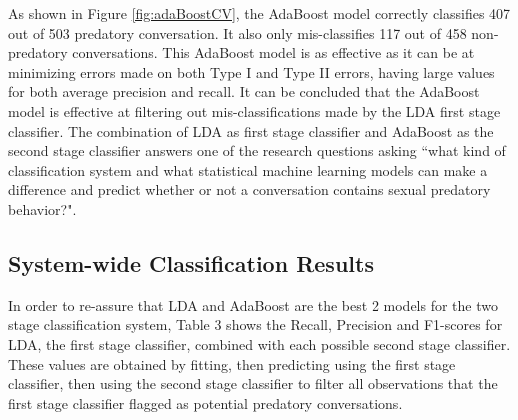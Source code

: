 \documentclass[11pt]{article}
\begin{document}
As shown in Figure \ref{fig:adaBoostCV}, the AdaBoost model correctly classifies 407 out of 503 predatory conversation. It also only mis-classifies 117 out of 458 non-predatory conversations. This AdaBoost model is as effective as it can be at minimizing errors made on both Type I and Type II errors, having large values for both average precision and recall. It can be concluded that the AdaBoost model is effective at filtering out mis-classifications made by the LDA first stage classifier. The combination of LDA as first stage classifier and AdaBoost as the second stage classifier answers one of the research questions asking ``what kind of classification system and what statistical machine learning models can make a difference and predict whether or not a conversation contains sexual predatory behavior?".

\subsection{System-wide Classification Results}
In order to re-assure that LDA and AdaBoost are the best 2 models for the two stage classification system, Table 3 shows the Recall, Precision and F1-scores for LDA, the first stage classifier, combined with each possible second stage classifier. These values are obtained by fitting, then predicting using the first stage classifier, then using the second stage classifier to filter all observations that the first stage classifier flagged as potential predatory conversations.
\end{document}
